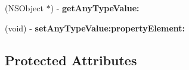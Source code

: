 \begin{DoxyCompactItemize}
\item 
\hypertarget{interface_request_result_handler_acae19d545efdc8e84cb115d093cde331}{}(N\+S\+Object $\ast$) -\/ {\bfseries get\+Any\+Type\+Value\+:}\label{interface_request_result_handler_acae19d545efdc8e84cb115d093cde331}

\item 
\hypertarget{interface_request_result_handler_a80cae97cdef727595779365ffd80ff37}{}(void) -\/ {\bfseries set\+Any\+Type\+Value\+:property\+Element\+:}\label{interface_request_result_handler_a80cae97cdef727595779365ffd80ff37}

\end{DoxyCompactItemize}
\subsection*{Protected Attributes}

